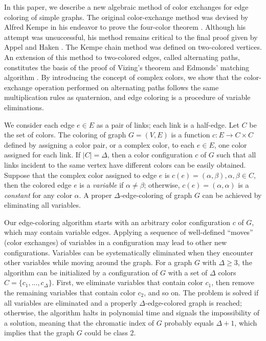 \documentclass[11pt]{article}
\begin{document}
In this paper, we describe a new algebraic method of color exchanges for edge coloring of simple graphs. The original color-exchange method was devised by Alfred Kempe in his endeavor to prove the four-color theorem \cite{kempe1879geographical}. Although his attempt was unsuccessful, his method remains critical to the final proof given by Appel and Haken \cite{appel1989every}. The Kempe chain method was defined on two-colored vertices. An extension of this method to two-colored edges, called alternating paths, constitutes the basis of the proof of Vizing's theorem and Edmonds' matching algorithm \cite{edmonds1987paths}. By introducing the concept of complex colors, we show that the color-exchange operation performed on alternating paths follows the same multiplication rules as quaternion, and edge coloring is a procedure of variable eliminations. 

We consider each edge $e\in E$ as a pair of links; each link is a half-edge. Let $C$ be the set of colors. The coloring of graph $G=(V,E)$ is a function $c:E\rightarrow C\times C$ defined by assigning a color pair, or a complex color, to each $e\in E$, one color assigned for each link. If $|C|=\Delta$, then a color configuration $c$ of $G$ such that all links incident to the same vertex have different colors can be easily obtained. Suppose that the complex color assigned to edge $e$ is $c(e)=(\alpha,\beta),\alpha,\beta \in C$, then the colored edge $e$ is a {\it variable} if $\alpha \neq \beta$; otherwise, $c(e)=(\alpha,\alpha)$ is a {\it constant} for any color $\alpha$. A proper $\Delta$-edge-coloring of graph $G$ can be achieved by eliminating all variables.

Our edge-coloring algorithm starts with an arbitrary color configuration $c$ of $G$, which may contain variable edges. Applying a sequence of well-defined ``moves'' (color exchanges) of variables in a configuration may lead to other new configurations. Variables can be systematically eliminated when they encounter other variables while moving around the graph. For a graph $G$ with $\Delta \geq 3$, the algorithm can be initialized by a configuration of $G$ with a set of $\Delta$ colors $C=\{c_1,...,c_\Delta \}$. First, we eliminate variables that contain color $c_1$, then remove the remaining variables that contain color $c_2$, and so on. The problem is solved if all variables are eliminated and a properly $\Delta$-edge-colored graph is reached; otherwise, the algorithm halts in polynomial time and signals the impossibility of a solution, meaning that the chromatic index of $G$ probably equals $\Delta+1$, which implies that the graph $G$ could be class 2.
\end{document}
